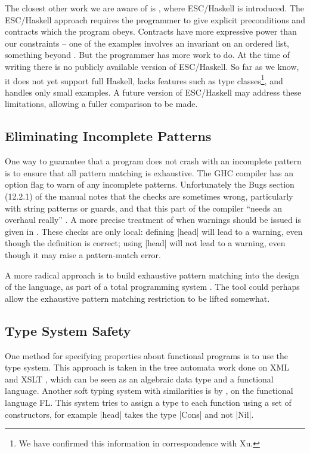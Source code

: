 The closest other work we are aware of is \citep{esc_haskell}, where ESC/Haskell is introduced. The ESC/Haskell approach requires the programmer to give explicit preconditions and contracts which the program obeys. Contracts have more expressive power than our constraints -- one of the examples involves an invariant on an ordered list, something beyond \catch{}. But the programmer has more work to do. At the time of writing there is no publicly available version of ESC/Haskell. So far as we know, it does not yet support full Haskell, lacks features such as type classes\footnote{We have confirmed this information in correspondence with Xu.}, and handles only small examples. A future version of ESC/Haskell may address these limitations, allowing a fuller comparison to be made.


\subsection{Eliminating Incomplete Patterns}

One way to guarantee that a program does not crash with an incomplete pattern is to ensure that all pattern matching is exhaustive. The GHC compiler \citep{ghc} has an option flag to warn of any incomplete patterns. Unfortunately the Bugs section (12.2.1) of the manual notes that the checks are sometimes wrong, particularly with string patterns or guards, and that this part of the compiler ``needs an overhaul really'' \citep{ghc}. A more precise treatment of when warnings should be issued is given in \citet{maranget:pattern_warnings}. These checks are only local: defining |head| will lead to a warning, even though the definition is correct; using |head| will not lead to a warning, even though it may raise a pattern-match error.

A more radical approach is to build exhaustive pattern matching into the design of the language, as part of a total programming system \citep{turner:total}. The \catch{} tool could perhaps allow the exhaustive pattern matching restriction to be lifted somewhat.


\subsection{Type System Safety}

One method for specifying properties about functional programs is to use the type system. This approach is taken in the tree automata work done on XML and XSLT \citep{static_xslt}, which can be seen as an algebraic data type and a functional language. Another soft typing system with similarities is by \citet{aiken:type_infer}, on the functional language FL. This system tries to assign a type to each function using a set of constructors, for example |head| takes the type |Cons| and not |Nil|.

